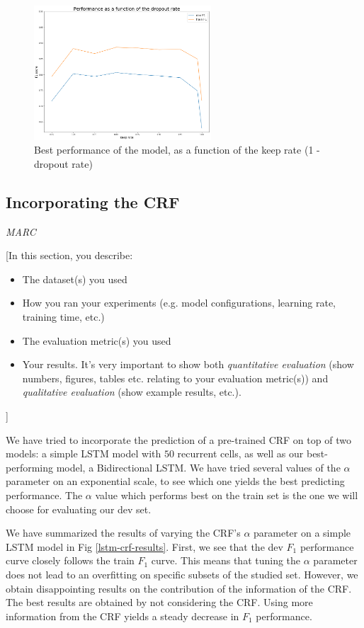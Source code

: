 \documentclass{article} %
\begin{document}
\begin{figure}
\begin{center}
\includegraphics[width=250px]{figs/dr_graph.png}
\caption{Best performance of the model, as a function of the keep rate (1 - dropout rate)}
\label{dr_graph}
\end{center}
\end{figure}

\subsection{Incorporating the CRF}
\textit{MARC}

[In this section, you describe:
\begin{itemize}
\item The dataset(s) you used
\item How you ran your experiments (e.g. model configurations, learning rate, training time, etc.)
\item The evaluation metric(s) you used
\item Your results. It's very important to show both \textit{quantitative evaluation} (show numbers, figures, tables etc. relating to your evaluation metric(s)) and \textit{qualitative evaluation} (show example results, etc.).
\end{itemize}]

We have tried to incorporate the prediction of a pre-trained CRF on top of two models: a simple LSTM model with $50$ recurrent cells, as well as our best-performing model, a Bidirectional LSTM. We have tried several values of the $\alpha$ parameter on an exponential scale, to see which one yields the best predicting performance. The $\alpha$ value which performs best on the train set is the one we will choose for evaluating our dev set.

We have summarized the results of varying the CRF's $\alpha$ parameter on a simple LSTM model in Fig \ref{lstm-crf-results}. First, we see that the dev $F_1$ performance curve closely follows the  train $F_1$ curve. This means that tuning the $\alpha$ parameter does not lead to an overfitting on specific subsets of the studied set. However, we obtain disappointing results on the contribution of the information of the CRF. The best results are obtained by not considering the CRF. Using more information from the CRF yields a steady decrease in $F_1$ performance.
\end{document}
